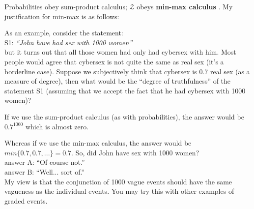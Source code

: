 Probabilities obey sum-product calculus;  $\mathcal{Z}$ obeys \textbf{min-max calculus} \citep*{Zadeh1965}.  My justification for min-max is as follows:

As an example, consider the statement:\\
\hspace*{1cm} S1: \textit{``John have had sex with 1000 women''}\\
but it turns out that all those women had only had cybersex with him.  Most people would agree that cybersex is not quite the same as real sex (it's a borderline case).  Suppose we subjectively think that cybersex is 0.7 real sex (as a measure of degree), then what would be the ``degree of truthfulness'' of the statement S1 (assuming that we accept the fact that he had cybersex with 1000 women)?

If we use the sum-product calculus (as with probabilities), the answer would be $ 0.7^{1000} $ which is almost zero.

Whereas if we use the min-max calculus, the answer would be $min\{0.7, 0.7, ...\} = 0.7$.  So, did John have sex with 1000 women?\\
\hspace*{1cm} answer A:  ``Of course not.''\\
\hspace*{1cm} answer B:  ``Well... sort of.''\\
My view is that the conjunction of 1000 vague events should have the same vagueness as the individual events.  You may try this with other examples of graded events.


